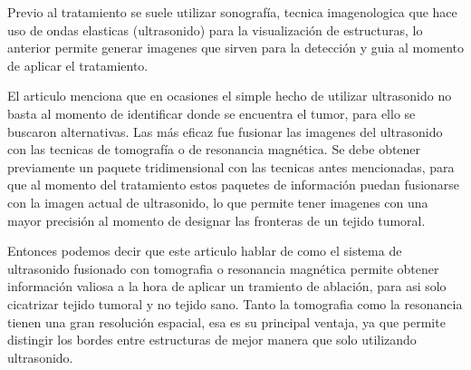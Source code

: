 \documentclass{article}
\begin{document}
Previo al tratamiento se suele utilizar sonografía, tecnica imagenologica que hace uso de ondas elasticas (ultrasonido) para la visualización de estructuras, lo anterior permite generar imagenes que sirven para la detección y guia al momento de aplicar el tratamiento. 


\vspace{10pt}

El articulo menciona que en ocasiones el simple hecho de utilizar ultrasonido no basta al momento de identificar donde se encuentra el tumor, para ello se buscaron alternativas. Las más eficaz fue fusionar las imagenes del ultrasonido con las tecnicas de tomografía o de resonancia magnética. Se debe obtener previamente un paquete tridimensional con las tecnicas antes mencionadas, para que al momento del tratamiento estos paquetes de información puedan fusionarse con la imagen actual de ultrasonido, lo que permite tener imagenes con una mayor precisión al momento de designar las fronteras de un tejido tumoral.

\vspace{10pt}

Entonces podemos decir que este articulo hablar de como el sistema de ultrasonido fusionado con tomografia o resonancia magnética permite obtener información valiosa a la hora de aplicar un tramiento de ablación, para asi solo cicatrizar tejido tumoral y no tejido sano. Tanto la tomografia como la resonancia tienen una gran resolución espacial, esa es su principal ventaja, ya que permite distingir los bordes entre estructuras de mejor manera que solo utilizando ultrasonido. 
\end{document}
